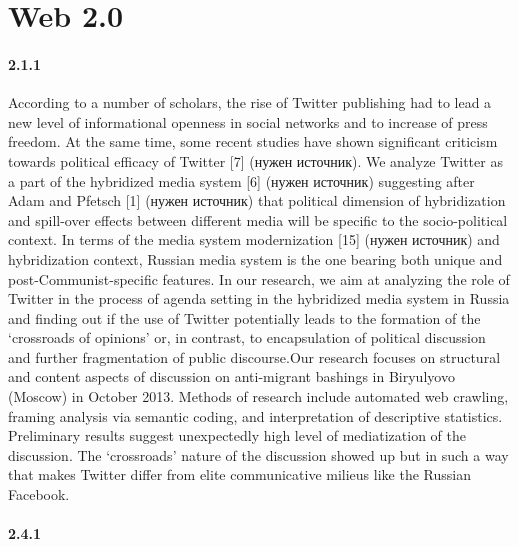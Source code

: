 \chapter{Web 2.0}\label{ch:ch2}

\subsubsection{2.1.1}

According to a number of scholars, the rise of Twitter publishing had to lead a new level of informational openness in social networks and to increase of press freedom. At the same time, some recent studies have shown significant criticism towards political efficacy of Twitter [7] (нужен источник). We analyze Twitter as a part of the hybridized media system [6] (нужен источник) suggesting after Adam and Pfetsch [1] (нужен источник) that political dimension of hybridization and spill-over effects between different media will be specific to the socio-political context. In terms of the media system modernization [15] (нужен источник) and hybridization context, Russian media system is the one bearing both unique and post-Communist-specific features. In our research, we aim at analyzing the role of Twitter in the process of agenda setting in the hybridized media system in Russia and finding out if the use of Twitter potentially leads to the formation of the ‘crossroads of opinions' or, in contrast, to encapsulation of political discussion and further fragmentation of public discourse.Our research focuses on structural and content aspects of discussion on anti-migrant bashings in Biryulyovo (Moscow) in October 2013. Methods of research include automated web crawling, framing analysis via semantic coding, and interpretation of descriptive statistics. Preliminary results suggest unexpectedly high level of mediatization of the discussion. The ‘crossroads' nature of the discussion showed up but in such a way that makes Twitter differ from elite communicative milieus like the Russian Facebook.

\subsubsection{2.4.1}

